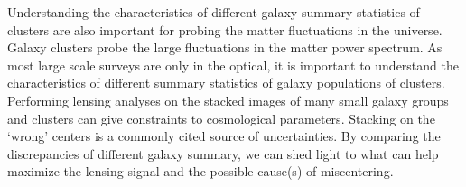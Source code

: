 Understanding the characteristics of different galaxy
summary statistics of clusters are also important for  
probing the matter fluctuations in the universe. 
Galaxy clusters probe the large fluctuations in the matter power spectrum.
As most large scale surveys are only in the optical, it is important to
understand the characteristics of different summary statistics of galaxy
populations of clusters.
Performing lensing analyses on the stacked images of 
many small galaxy groups and clusters can give constraints to cosmological
parameters. Stacking on the `wrong' centers is a commonly cited
source of uncertainties. By comparing the discrepancies of different galaxy
summary, we can shed light to what can help maximize the lensing signal and 
the possible cause(s) of miscentering. 

% 
% 


